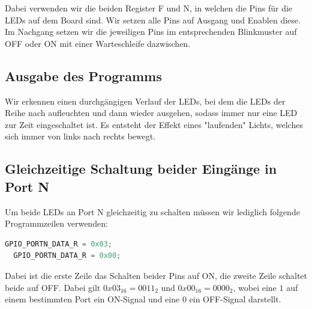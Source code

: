 \documentclass{report}
\begin{document}
Dabei verwenden wir die beiden Register F und N, in welchen die Pins für die LEDs auf dem Board sind. Wir setzen alle Pins auf Ausgang und Enablen diese. Im Nachgang setzen wir die jeweiligen Pins im entsprechenden Blinkmuster auf OFF oder ON mit einer Warteschleife dazwischen.

\subsection{Ausgabe des Programms}

Wir erkennen einen durchgängigen Verlauf der LEDs, bei dem die LEDs der Reihe nach aufleuchten und dann wieder ausgehen, sodass immer nur eine
LED zur Zeit eingeschaltet ist. Es entsteht der Effekt eines "laufenden" Lichts, welches sich immer von links nach rechts bewegt.

\newpage

\subsection{Gleichzeitige Schaltung beider Eingänge in Port N}

Um beide LEDs an Port N gleichzeitig zu schalten müssen wir lediglich folgende Programmzeilen verwenden:
\begin{lstlisting}[language=c, caption={Port N Pins gleichzeitig schalten}, captionpos=b]
  GPIO_PORTN_DATA_R = 0x03;
  GPIO_PORTN_DATA_R = 0x00;
\end{lstlisting}
Dabei ist die erste Zeile das Schalten beider Pins auf ON, die zweite Zeile schaltet beide auf OFF. Dabei gilt $0x03_{16} = 0011_2$ und $0x00_{16} = 0000_2$, wobei eine $1$ auf einem bestimmten Port ein ON-Signal und eine $0$ ein OFF-Signal darstellt.
\end{document}
